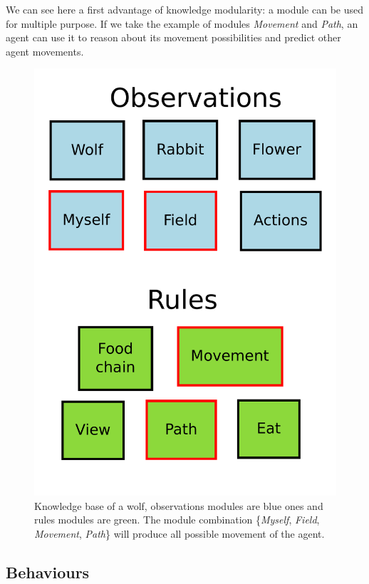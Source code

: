 \documentclass{aamas2012}
\begin{document}
	We can see here a first advantage of knowledge modularity: a module can be used for multiple purpose.
	If we take the example of modules \emph{Movement} and \emph{Path}, an agent can use it to reason about its movement possibilities and predict other agent movements.

	\begin{figure}
		\centering
		\includegraphics[keepaspectratio=true, scale=0.25]{module_combination.pdf}
		\caption
		{
			\label{module_combination}
			Knowledge base of a wolf, observations modules are blue ones and rules modules are green.
			The module combination \{\emph{Myself}, \emph{Field}, \emph{Movement}, \emph{Path}\} will produce all possible movement of the agent.
		}
	\end{figure}

\subsection{Behaviours}
\end{document}
